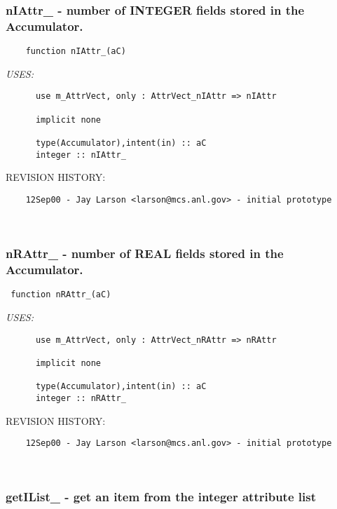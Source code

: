  \subsubsection{nIAttr\_ - number of INTEGER fields stored in the Accumulator.}


 
 
\begin{verbatim} 
    function nIAttr_(aC)\end{verbatim}{\em USES:}
\begin{verbatim}      use m_AttrVect, only : AttrVect_nIAttr => nIAttr
 
      implicit none
 
      type(Accumulator),intent(in) :: aC
      integer :: nIAttr_
 \end{verbatim}{\sf REVISION HISTORY:}
\begin{verbatim}  	12Sep00 - Jay Larson <larson@mcs.anl.gov> - initial prototype\end{verbatim}
 
 
\mbox{}\hrulefill\ 
 

 \subsubsection{nRAttr\_ - number of REAL fields stored in the Accumulator.}


 
 
\begin{verbatim} 
 function nRAttr_(aC)\end{verbatim}{\em USES:}
\begin{verbatim}      use m_AttrVect, only : AttrVect_nRAttr => nRAttr
 
      implicit none
 
      type(Accumulator),intent(in) :: aC
      integer :: nRAttr_
 \end{verbatim}{\sf REVISION HISTORY:}
\begin{verbatim}  	12Sep00 - Jay Larson <larson@mcs.anl.gov> - initial prototype\end{verbatim}
 
 
\mbox{}\hrulefill\ 
 

 \subsubsection{getIList\_ - get an item from the integer attribute list }


